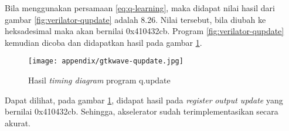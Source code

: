 Bila menggunakan persamaan \ref{eq:q-learning}, maka didapat nilai hasil dari gambar \ref{fig:verilator-qupdate} adalah 8.26. Nilai tersebut, bila diubah ke heksadesimal maka akan bernilai 0x410432cb. Program \ref{fig:verilator-qupdate} kemudian dicoba dan didapatkan hasil pada gambar \ref{fig:gtkwave-qupdate}.

\begin{figure}[h]
	\centering
	\texttt{[image: appendix/gtkwave-qupdate.jpg]}
	\caption{Hasil \textit{timing diagram} program q.update}
	\label{fig:gtkwave-qupdate}
\end{figure}

Dapat dilihat, pada gambar \ref{fig:gtkwave-qupdate}, didapat hasil pada \textit{register} \textit{output update} yang bernilai 0x410432cb. Sehingga, akselerator sudah terimplementasikan secara akurat.
